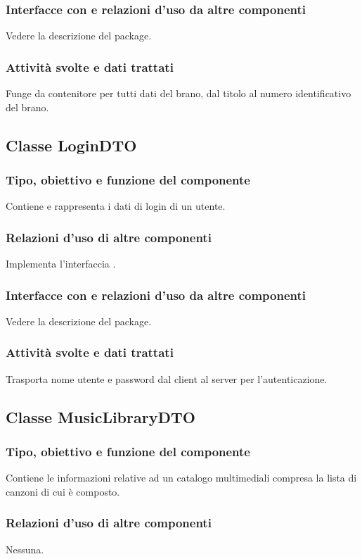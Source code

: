 \subsubsection*{Interfacce con e relazioni d'uso da altre componenti}
Vedere la descrizione del package.
\subsubsection*{Attivit\`a svolte e dati trattati}
Funge da contenitore per tutti dati del brano, dal titolo al numero
identificativo del brano. 

\subsection{Classe LoginDTO}
\subsubsection*{Tipo, obiettivo e funzione del componente}
Contiene e rappresenta i dati di login di un utente.
\subsubsection*{Relazioni d'uso di altre componenti}
Implementa l'interfaccia .
\subsubsection*{Interfacce con e relazioni d'uso da altre componenti}
Vedere la descrizione del package.
\subsubsection*{Attivit\`a svolte e dati trattati}
Trasporta nome utente e password dal client al server per l'autenticazione.

\subsection{Classe MusicLibraryDTO}
\subsubsection*{Tipo, obiettivo e funzione del componente}
Contiene le informazioni relative ad un catalogo multimediali compresa la lista
di canzoni di cui \`e composto. 
\subsubsection*{Relazioni d'uso di altre componenti} 
Nessuna.

